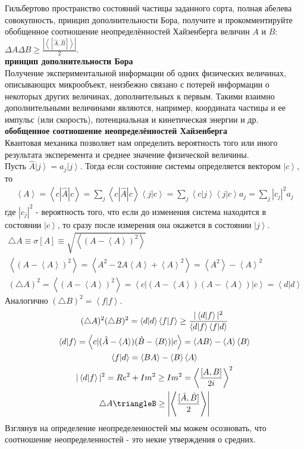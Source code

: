 \documentclass[__main__.tex]{subfiles}
\begin{document}
Гильбертово пространство состояний частицы заданного сорта, полная абелева совокупность, принцип дополнительности Бора, получите и прокомментируйте обобщенное соотношение неопределённостей Хайзенберга величин $A$ и $B$: $\Delta{A}\Delta{B}\ge\frac{\left|\left<\left[\hat{A},\hat{B}\right]\right>\right|}{2}$.\\ 


\textbf{принцип дополнительности Бора}\\
Получение экспериментальной информации об одних физических величинах, описывающих микрообъект, неизбежно связано с потерей информации о некоторых других величинах, дополнительных к первым. Такими взаимно дополнительными величинами являются, например, координата частицы и ее импульс (или скорость), потенциальная и кинетическая энергии и др.
\textbf{обобщенное соотношение неопределённостей Хайзенберга}\\
Квантовая механика позволяет нам определить вероятность того или иного результата эксперемента и среднее значение физической величины.\\
Пусть $\hat{A}\left|j\right> = a_j \left|j\right>$. Тогда если состояние системы определяется вектором $\left|c\right>$, то\\
\begin{gather}
\left<A\right> = \left<c|\hat{A}|c\right> = \sum_j \left<c|\hat{A}|c\right>\left<j|c\right> = \sum_j \left<c|j\right>\left<j|c\right>a_j = \sum_j |c_j|^2 a_j
\end{gather}
где $|c_j|^2$ - вероятность того, что если до изменения система находится в состоянии $\left|c\right>$, то сразу после измерения она окажется в состоянии $\left|j\right>$.\\
\begin{gather}
\triangle A \equiv \sigma[A] \equiv \sqrt{\left<(A-\left<A\right>)^2\right>}\\
\left<(A-\left<A\right>)^2\right> = \left<A^2-2A\left<A\right>+\left<A\right>^2\right> = \left<A^2\right> - \left<A\right>^2\\
(\triangle A)^2 = \left<(A-\left<A\right>)^2\right> = \left< c|(A-\left<A\right>)(A-\left<A\right>)|c\right> = \left<d|d\right>
\end{gather}
Аналогично $(\triangle B)^2 = \left<f|f\right>$.\\
\begin{gather}
(\triangle A)^2(\triangle B)^2 = \left<d|d\right>\left<f|f\right> \geq \frac{|\left<d|f\right>|^2}{\left<d|f\right>\left<f|d\right>}\\
\left<d|f\right> = \left<c|(\hat{A}-\left<A\right>)(\hat{B} - \left<B\right>)|c\right> = \left<AB\right> - \left< A\right> \left< B\right>\\
\left<f|d\right> = \left<BA\right> - \left<B\right>\left<A\right>\\
|\left<d|f\right>|^2 = Re^2+Im^2 \geq Im^2 = \left<\frac{[A,B]}{2i}\right>^2\\
\triangle A\triangleB \geq \left|\left<\frac{[\hat{A},\hat{B}]}{2}\right>\right|
\end{gather}
Взглянув на определение неопределенностей мы можем осозновать, что соотношение неопределенностей - это некие утверждения о средних.\\
\end{document}
